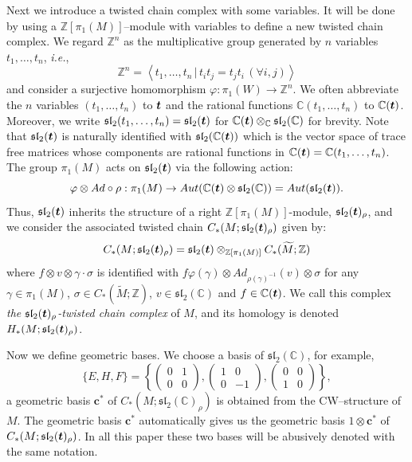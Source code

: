 \documentclass[a4paper]{amsart}
\theoremstyle{plain}
\theoremstyle{definition}
\theoremstyle{remark}
\newcommand{\ie}{\emph{i.e.}}
\newcommand{\ZZ}{{\mathbb Z}}
\newcommand{\CC}{{\mathbb C}}
\newcommand{\bm}[1]{\mbox{\boldmath $#1$}}
\newcommand{\sll}{\mathfrak{sl}_2(\CC)}
\newcommand{\sllrho}{\mathfrak{sl}_2(\CC)_\rho}
\newcommand{\sllmt}{\mathfrak{sl}_2(\bm{t})}
\newcommand{\msll}[1]{\mathfrak{sl}_2(#1)}
\newcommand{\otAd}[2]{#1 \otimes Ad \circ #2}
\newcommand{\cbasis}[2][c]{\mathbf{#1}^{#2}}
\newcommand{\ucover}[1]{\widetilde{#1}}
\begin{document}
Next we introduce a twisted chain complex with some variables.
It will be done by using a $\ZZ[\pi_1(M)]$--module with variables 
to define a new twisted chain complex.
We regard $\ZZ^n$ as the multiplicative group generated by $n$ variables
$t_1, \ldots, t_n$, \ie, 
$$\ZZ^n = \left\langle t_1, \ldots, t_n \,|\, t_it_j = t_jt_i \, (\forall i, j)\right\rangle$$
and 
consider  a surjective homomorphism $\varphi\colon \pi_1(W)\to\ZZ^n$.
We often abbreviate the $n$ variables $(t_1, \ldots, t_n)$ to $\bm{t}$ and 
the rational functions $\CC(t_1, \ldots, t_n)$ to $\CC(\bm{t})$.
Moreover, we write 
$\msll{t_1, \ldots, t_n} = \sllmt$ for $\CC(\bm{t}) \otimes_{\CC} \sll$ 
for brevity.  
Note that $\sllmt$ is naturally identified with $\msll{\CC(\bm{t})}$ 
which is the vector space of trace free matrices whose components are rational functions 
in $\CC(\bm{t}) = \CC(t_1, \ldots, t_n)$.
The group $\pi_1(M)$ acts on $\sllmt$ via the following action: 
$$
\otAd{\varphi}{\rho} : 
  \pi_1(M) \to Aut(\CC(\bm{t}) \otimes \sll) = Aut(\sllmt).
$$ 
Thus, $\sllmt$ inherits the structure of a right $\ZZ[\pi_1(M)]$-module, $\sllmt_\rho$, and we consider the associated twisted chain $C_*(M; \sllmt_\rho)$ given by:
$$
C_*(M; \sllmt_\rho) = \sllmt \otimes_{\ZZ[\pi_1(M)]} C_*(\ucover{M}; \ZZ)
$$
where $ f \otimes v \otimes \gamma \cdot \sigma$ is identified with 
$f \varphi(\gamma) \otimes Ad_{\rho(\gamma)^{-1}}(v) \otimes \sigma$ for
any 
$\gamma \in \pi_1(M)$, 
$\sigma \in C_*(\ucover{M};\ZZ)$, 
$v \in \sll$ and 
$f \in \CC(\bm{t})$.
We call this complex {\it the $\sllmt_\rho$-twisted chain complex} of $M$, and its homology is denoted $H_*(M; \sllmt_\rho)$.


Now we define geometric bases. We choose a basis of $\sll$, for example, 
\begin{equation}\label{eqn:basis_sll}
\{E, H, F\} 
=
\left\{ 
\left(
  \begin{array}{cc}
    0&1\\
    0&0
  \end{array}
\right),
\left(
  \begin{array}{cc}
    1&0\\
    0&-1
  \end{array}
\right), 
\left(
  \begin{array}{cc}
    0&0\\
    1&0
  \end{array}
\right)
\right\},
\end{equation}
a geometric basis $\cbasis{*}$ of $C_*(M; \sllrho)$ is obtained from 
the CW--structure of $M$. The geometric basis $\cbasis{*}$ automatically gives
us the geometric basis $1 \otimes \cbasis{*}$ of $C_*(M; \sllmt_\rho)$. In
all this paper these two bases will be abusively denoted with the same
notation.
\end{document}
